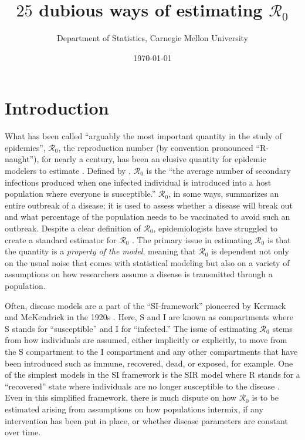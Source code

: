 \documentclass[12pt]{article}
\newcommand{\XX}{\ensuremath{25}} %
\newcommand{\rr}{\ensuremath{\mathcal{R}_0}}
\begin{document}




\title{$\XX$ dubious ways of estimating $\rr$}
\author{ Department of Statistics, Carnegie Mellon University}
\date{\today}
\maketitle



\section{Introduction}\label{sec:intro}
What has been called ``arguably the most important quantity in the study of epidemics'', $\mathcal{R}_0$, the reproduction number (by convention pronounced ``R-naught''), for nearly a century, has been an elusive quantity for epidemic modelers to estimate \citep{Heesterbeek2002}.  Defined by \citet{anderson1992}, $\rr$ is the ``the average number of secondary infections produced when one infected individual is introduced into a host population where everyone is susceptible.''  $\rr$, in some ways, summarizes an entire outbreak of a disease; it  is used to assess whether a disease will break out and what percentage of the population needs to be vaccinated to avoid such an outbreak.  Despite a clear definition of $\rr$, epidemiologists have struggled to create a standard  estimator for $\rr$  \citep{hethcote2000}.  The primary issue in estimating $\rr$ is that the quantity is a \textit{property of the model}, meaning that $\rr$ is dependent not only on the usual noise that comes with statistical modeling but also on a variety of assumptions on how researchers assume a disease is transmitted through a population.

Often, disease models are a part of the ``SI-framework'' pioneered by Kermack and McKendrick in the 1920s \citep{getz2006}.  Here, S and I are known as compartments where S stands for ``susceptible'' and I for ``infected.''  The issue of estimating $\rr$ stems from how individuals are assumed, either implicitly or explicitly, to move from the S compartment to the I compartment and any other compartments that have been introduced such as immune, recovered, dead, or exposed, for example.  One of the simplest models in the SI framework is the SIR model where R stands for a ``recovered'' state where individuals are no longer susceptible to the disease \citep{Kermack700}.  Even in this simplified framework, there is much dispute on how $\rr$ is to be estimated arising from assumptions on how populations intermix, if any intervention has been put in place, or whether disease parameters are constant over time.
\end{document}
